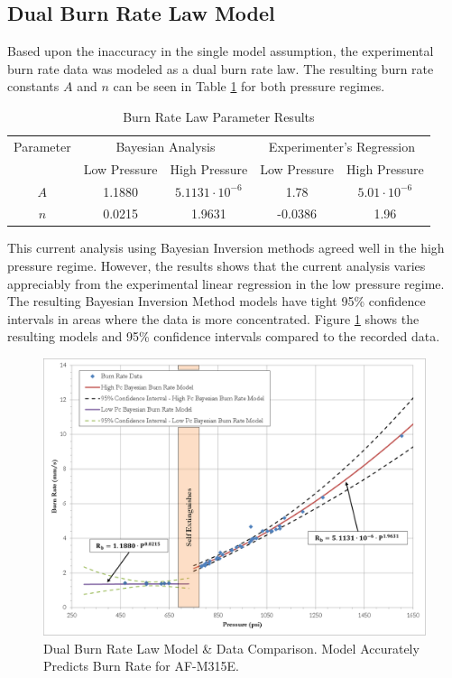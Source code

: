 \documentclass{article}
\begin{document}
\subsection{Dual Burn Rate Law Model} \label{twoBurnRateResults}

Based upon the inaccuracy in the single model assumption, the experimental burn rate data was modeled
as a dual burn rate law. The resulting burn rate constants $A$ and $n$ can be seen in Table
\ref{Table:brlpresults} for both pressure regimes. 

\begin{table}
\centering
\caption{Burn Rate Law Parameter Results}
\label{Table:brlpresults}
\begin{tabular}{|c|c|c|c|c|}
\hline
Parameter & \multicolumn{2}{|c|}{Bayesian Analysis} & \multicolumn{2}{|c|}{Experimenter's Regression} \\ \cline{2-5}
 & Low Pressure & High Pressure & Low Pressure & High Pressure \\ \hline
$A$ & 1.1880 & $5.1131 \cdot 10^{-6}$ & 1.78 & $5.01 \cdot 10^{-6}$ \\ \hline
$n$ & 0.0215 & 1.9631 & -0.0386 & 1.96 \\
\hline
\end{tabular}
\end{table}

This current analysis using Bayesian Inversion methods agreed well in the high pressure regime. However, the
results shows that the current analysis varies appreciably from the experimental linear regression in the low
pressure regime. The resulting Bayesian Inversion Method models have tight 95\% confidence intervals in 
areas where the data is more concentrated. Figure \ref{DualBRfig} shows the resulting models and 95\% confidence 
intervals compared to the recorded data.

\begin{figure}[htb!]
\centering
\includegraphics[width=0.25\textheight]{Dual_Burn_Rate_Results.png}
\caption{Dual Burn Rate Law Model \& Data Comparison. Model Accurately Predicts Burn Rate for AF-M315E.}
\label{DualBRfig}
\end{figure}
\end{document}
